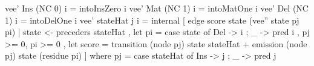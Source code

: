 vee' Ins (NC 0) i = intoInsZero i
vee' Mat (NC 1) i = intoMatOne i
vee' Del (NC 1) i = intoDelOne i
vee' stateHat j i =
  internal [ edge score state (vee'' state pj pi)
           | state <- preceders stateHat
           , let pi = case state of { Del -> i ; _ -> pred i }
           , pj >= 0, pi >= 0
           , let score = transition (node pj) state stateHat
                         + emission (node pj) state (residue pi)
           ]
  where pj = case stateHat of { Ins -> j ; _ -> pred j }
